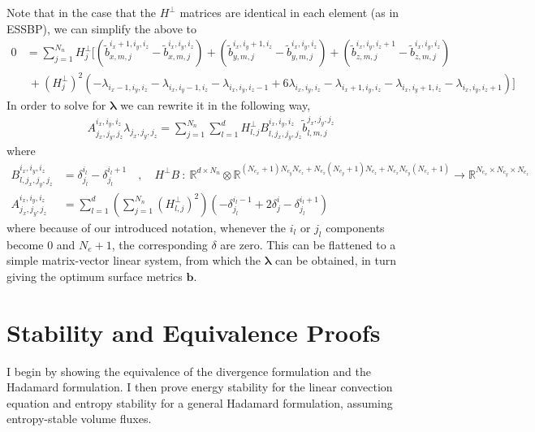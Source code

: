 \documentclass[12pt,a4paper]{article}
\begin{document}
Note that in the case that the $H^\bot$ matrices are identical in each element (as in ESSBP), we can simplify the above to
\begin{align*}
0 &=  \sum_{j=1}^{N_n} H^\bot_{j} \Big[  \left( \tilde{b}_{x,m,j}^{i_x+1,i_y,i_z} - \tilde{b}_{x,m,j}^{i_x,i_y,i_z} \right) + \left( \tilde{b}_{y,m,j}^{i_x,i_y+1,i_z} - \tilde{b}_{y,m,j}^{i_x,i_y,i_z} \right) + \left( \tilde{b}_{z,m,j}^{i_x,i_y,i_z+1} - \tilde{b}_{z,m,j}^{i_x,i_y,i_z} \right) \\
& \ + \left( H^\bot_{j}  \right)^2 \left( - \lambda_{i_x-1,i_y,i_z}  - \lambda_{i_x,i_y-1,i_z} - \lambda_{i_x,i_y,i_z-1} + 6 \lambda_{i_x,i_y,i_z} -  \lambda_{i_x+1,i_y,i_z} - \lambda_{i_x,i_y+1,i_z} - \lambda_{i_x,i_y,i_z+1} \right) \Big]
\end{align*}
In order to solve for $\bm{\lambda}$ we can rewrite it in the following way,
\begin{align*}
A^{i_x,i_y,i_z}_{j_x,j_y,j_z} \lambda_{j_x,j_y,j_z} =  \sum_{j=1}^{N_n} \sum_{l=1}^d H^\bot_{l,j} B^{i_x,i_y,i_z}_{l,j_x,j_y,j_z} \tilde{b}_{l,m,j}^{j_x,j_y,j_z}
\end{align*}
where
\begin{align*}
B^{i_x,i_y,i_z}_{l,j_x,j_y,j_z} &= \delta^{i_l}_{j_l} - \delta^{i_l+1}_{j_l} \quad , \quad 
H^\bot B \ : \ \mathds{R}^{d \times N_n} \otimes \mathds{R}^{(N_{e_x} + 1)N_{e_y} N_{e_z} + N_{e_x} (N_{e_y}+1) N_{e_z} + N_{e_x} N_{e_y} (N_{e_z}+1)}  \rightarrow \mathds{R}^{N_{e_x} \times N_{e_y} \times N_{e_z}}  \\
A^{i_x,i_y,i_z}_{j_x,j_y,j_z} &= 
\sum_{l=1}^d \left( \sum_{j=1}^{N_n} \left( H^\bot_{l,j} \right)^2 \right) \left(
  -  \delta_{j_l}^{i_l-1} + 2 \delta_{j}^{i} - \delta_{j_l}^{i_l+1} \right)
\end{align*}
where because of our introduced notation, whenever the $i_l$ or $j_l$ components become $0$ and $N_e + 1$, the corresponding $\delta$ are zero. This can be flattened to a simple matrix-vector linear system, from which the $\bm{\lambda}$ can be obtained, in turn giving the optimum surface metrics $\bm{b}$.

\newpage

\section{Stability and Equivalence Proofs}

I begin by showing the equivalence of the divergence formulation and the Hadamard formulation. I then prove energy stability for the linear convection equation and entropy stability for a general Hadamard formulation, assuming entropy-stable volume fluxes.
\end{document}
